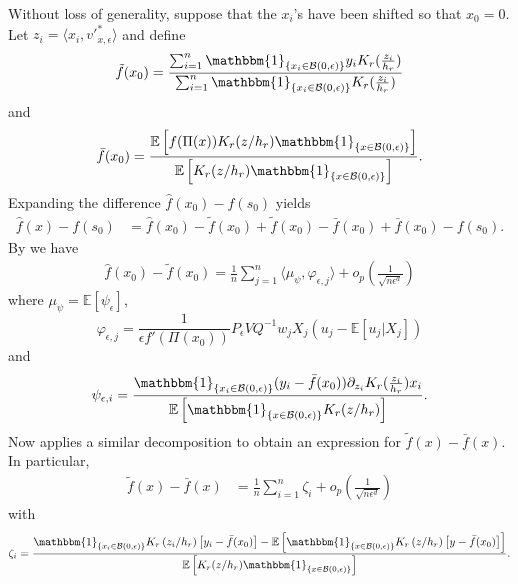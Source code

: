 \documentclass[11pt]{article}
\begin{document}
Without loss of generality, suppose that the $x_i$'s have been shifted so that $x_0 = 0$. Let $z_i = \langle x_i, v'^*_{x, \epsilon}\rangle$ and define
\begin{equation}
\tilde{f}(x_0) = \frac{\sum_{i=1}^n \mathbbm{1}_{\{x_i\in \mathcal{B}(0, \epsilon)\}}y_iK_r(\frac{z_i}{h_r})}{\sum_{i=1}^n \mathbbm{1}_{\{x_i\in \mathcal{B}(0, \epsilon)\}}K_r(\frac{z_i}{h_r})} \label{eq: ftilde}
\end{equation}
and
\begin{equation}\bar{f}(x_0) = \frac{\mathbb{E}\left[f(\Pi(x))K_r(z/h_r)\mathbbm{1}_{\{x\in \mathcal{B}(0, \epsilon)\}}\right]}{\mathbb{E}\left[K_r(z/h_r)\mathbbm{1}_{\{x\in \mathcal{B}(0, \epsilon)\}}\right]}. \label{eq: fbar}
\end{equation}
 Expanding the difference $\hat{f}(x_0) - f(s_0)$ yields
\begin{align}
    \hat{f}(x) - f(s_0) &= \hat{f}(x_0) - \tilde{f}(x_0) + 
    \tilde{f}(x_0) - \bar{f}(x_0) + \bar{f}(x_0) - f(s_0).
\end{align}
By  we have
\begin{align}
    \hat{f}(x_0) - \tilde{f}(x_0) = \frac{1}{n}\sum_{j = 1}^n\langle\mu_{\psi}, \varphi_{\epsilon, j}\rangle + o_p\left(\frac{1}{\sqrt{n\epsilon^d}}\right)
\end{align}
where $\mu_{\psi} = \mathbb{E}[\psi_{\epsilon}]$,  
\[\varphi_{\epsilon, j} = \frac{1}{\epsilon f'(\Pi(x_0))}P_{\epsilon}VQ^{-1}w_jX_j(u_j - \mathbb{E}[u_j|X_j])\]
and
\[\psi_{\epsilon, i} = \frac{\mathbbm{1}_{\{x_i \in \mathcal{B}(0, \epsilon)\}}(y_i - \bar{f}(x_0))\partial_{z_i}K_r(\frac{z_i}{h_r})x_i}{\mathbb{E}\left[\mathbbm{1}_{\{x \in \mathcal{B}(0, \epsilon)\}}K_r(z/h_r)\right]}.\]
Now  applies a similar decomposition to obtain an expression for $\tilde{f}(x) - \bar{f}(x)$. In particular,
\begin{align*}
    \tilde{f}(x) - \bar{f}(x) &= \frac{1}{n}\sum_{i = 1}^n\zeta_i + o_p\left(\frac{1}{\sqrt{n\epsilon^{d}}}\right) 
\end{align*}
with 
\begin{equation*}
    \zeta_i = \frac{\mathbbm{1}_{\{x_i \in \mathcal{B}(0, \epsilon)\}}K_r\left(z_i/h_r\right)\left[y_i - \bar{f}(x_0)\right] - \mathbb{E}\left[\mathbbm{1}_{\{x \in \mathcal{B}(0, \epsilon)\}}K_r\left(z/h_r\right)\left[y - \bar{f}(x_0)\right]\right]}{\mathbb{E}\left[K_r(z/h_r)\mathbbm{1}_{\{x\in \mathcal{B}(0, \epsilon)\}}\right]}.
\end{equation*}
\end{document}
